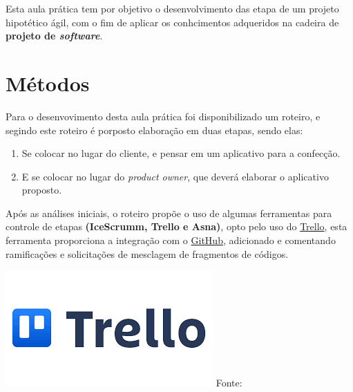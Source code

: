 \par Esta aula prática tem por objetivo o desenvolvimento das etapa de um projeto hipotético ágil, com o fim de aplicar os conhcimentos adqueridos na cadeira de \textbf{projeto de \textit{software}}.

\section{Métodos}
\par Para o desenvovimento desta aula prática foi disponibilizado um roteiro, e segindo este roteiro é porposto elaboração em duas etapas, sendo elas:
\begin{enumerate}
  \item Se colocar no lugar do cliente, e pensar em um aplicativo para a confecção.
  \item E se colocar no lugar do \textit{product owner}, que deverá elaborar o aplicativo proposto.
\end{enumerate}


\noindent \begin{minipage}[c]{0.6\textwidth}
  \vspace {1cm}
\par Após as análises iniciais, o roteiro propõe o uso de algumas ferramentas para controle de etapas \textbf{(IceScrumm, Trello e Asna)}, opto pelo uso do \href{https://trello.com/home}{Trello}, esta ferramenta proporciona a integração com o \href{www.github.com}{GitHub}, adicionado e comentando ramificações e solicitações de mesclagem de fragmentos de códigos.

\end{minipage}
\begin{minipage}[c]{0.4\textwidth}
  \includegraphics[width=\textwidth]{figure/trello.png}
  \label{fig:log_trello}
  {\fontsize{10pt}{\baselineskip} \selectfont Fonte: }
\end{minipage}




